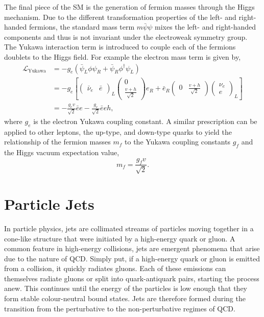The final piece of the SM is the generation of fermion masses through the Higgs mechanism.
Due to the different transformation properties of the left- and right-handed fermions, the standard mass term $m \bar \psi \psi$ mixes the left- and right-handed components and thus is not invariant under the electroweak symmetry group.
The Yukawa interaction term is introduced to couple each of the fermions doublets to the Higgs field.
For example the electron mass term is given by,
\begin{equation}
	\label{eq:yukawa}
	\begin{split}
		\mathcal{L}_\text{Yukawa} & = -g_e( \bar \psi_L \phi \psi_R + \bar \psi_R \phi^\dagger \psi_L)    \\
		                          & = -g_e \left[
			\begin{pmatrix} \bar \nu_e & \bar e \end{pmatrix}_L \begin{pmatrix} 0 \\ \frac{v + h}{\sqrt{2}} \end{pmatrix} e_R
			+ \bar e_R \begin{pmatrix} 0 & \frac{v + h}{\sqrt{2}} \end{pmatrix} \begin{pmatrix} \nu_e \\ e \end{pmatrix}_L
		\right]                                                                                           \\
		                          & = -\frac{g_e v}{\sqrt{2}} \bar e e - \frac{g_e}{\sqrt{2}} \bar e e h,
	\end{split}
\end{equation}
where $g_e$ is the electron Yukawa coupling constant.
A similar prescription can be applied to other leptons, the up-type, and down-type quarks to yield the relationship of the fermion masses $m_f$ to the Yukawa coupling constants $g_f$ and the Higgs vacuum expectation value,
\begin{equation}
	\label{eq:fermion_mass}
	m_f = \frac{g_f v}{\sqrt{2}}.
\end{equation}

\section{Particle Jets}
\label{sec:jets}

In particle physics, jets are collimated streams of particles moving together in a cone-like structure that were initiated by a high-energy quark or gluon.
A common feature in high-energy collisions, jets are emergent phenomena that arise due to the nature of QCD.
Simply put, if a high-energy quark or gluon is emitted from a collision, it quickly radiates gluons.
Each of these emissions can themselves radiate gluons or split into quark-antiquark pairs, starting the process anew.
This continues until the energy of the particles is low enough that they form stable colour-neutral bound states.
Jets are therefore formed during the transition from the perturbative to the non-perturbative regimes of QCD.

